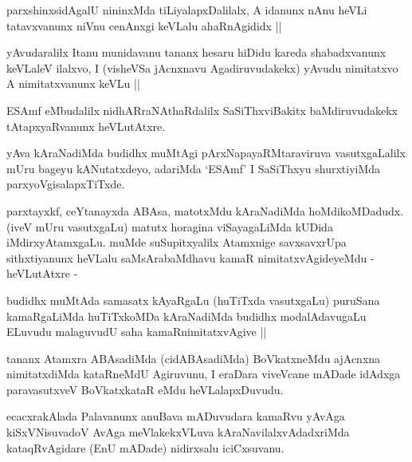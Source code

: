 \begin{artha}
parxshinxsidAgalU nininxMda tiLiyalapxDalilalx, A idanunx nAnu heVLi tatavxvanunx niVnu cenAnxgi keVLalu ahaRnAgididx ||
\end{artha}


\begin{artha}
yAvudaralilx Itanu munidavanu tananx hesaru hiDidu kareda shabadxvanunx keVLaleV ilalxvo, I (visheVSa jAcnxnavu Agadiruvudakekx) yAvudu nimitatxvo A nimitatxvanunx keVLu ||
\end{artha}

\begin{artha}
ESAmf eMbudalilx nidhARraNAthaRdalilx SaSiThxviBakitx baMdiruvudakekx tAtapxyaRvanunx heVLutAtxre.
\end{artha}

\begin{artha}
yAva kAraNadiMda budidhx muMtAgi pArxNapayaRMtaraviruva vasutxgaLalilx mUru bageyu kANutatxdeyo, adariMda `ESAmf' I SaSiThxyu shurxtiyiMda parxyoVgisalapxTiTxde.
\end{artha}

\begin{artha}
parxtayxkf, ceYtanayxda ABAsa, matotxMdu kAraNadiMda hoMdikoMDadudx. (iveV mUru vasutxgaLu) matutx horagina viSayagaLiMda kUDida iMdirxyAtamxgaLu. muMde suSupitxyalilx Atamxnige savxsavxrUpa sithxtiyanunx heVLalu saMsArabaMdhavu kamaR nimitatxvAgideyeMdu - heVLutAtxre -
\end{artha}

\begin{artha}
budidhx muMtAda samasatx kAyaRgaLu (huTiTxda vasutxgaLu) puruSana kamaRgaLiMda huTiTxkoMDa kAraNadiMda budidhx modalAdavugaLu ELuvudu malaguvudU saha kamaRnimitatxvAgive ||
\end{artha}


\begin{artha}
tananx Atamxra ABAsadiMda (cidABAsadiMda) BoVkatxneMdu ajAcnxna nimitatxdiMda kataRneMdU Agiruvunu, I eraDara viveVcane mADade idAdxga paravasutxveV BoVkatxkataR eMdu heVLalapxDuvudu.
\end{artha}


\begin{artha}
ecacxrakAlada Palavanunx anuBava mADuvudara kamaRvu yAvAga kiSxVNisuvadoV AvAga meVlakekxVLuva kAraNavilalxvAdadxriMda kataqRvAgidare (EnU mADade) nidirxsalu iciCxsuvanu.
\end{artha}

